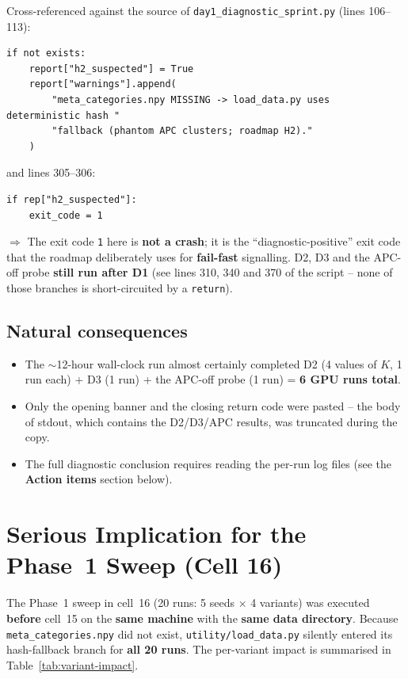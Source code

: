 \documentclass[11pt,a4paper]{article}
\begin{document}
\noindent Cross-referenced against the source of
\texttt{day1\_diagnostic\_sprint.py} (lines 106--113):

\begin{lstlisting}[style=py]
if not exists:
    report["h2_suspected"] = True
    report["warnings"].append(
        "meta_categories.npy MISSING -> load_data.py uses deterministic hash "
        "fallback (phantom APC clusters; roadmap H2)."
    )
\end{lstlisting}

\noindent and lines 305--306:

\begin{lstlisting}[style=py]
if rep["h2_suspected"]:
    exit_code = 1
\end{lstlisting}

\noindent $\Rightarrow$ The exit code \texttt{1} here is \textbf{not a crash}; it is the
``diagnostic-positive'' exit code that the roadmap deliberately uses for
\textbf{fail-fast} signalling. D2, D3 and the APC-off probe \textbf{still run
after D1} (see lines 310, 340 and 370 of the script -- none of those branches
is short-circuited by a \texttt{return}).

\subsection*{Natural consequences}

\begin{itemize}[leftmargin=*]
  \item The $\sim$12-hour wall-clock run almost certainly completed
        D2 (4 values of $K$, 1 run each) + D3 (1 run) + the APC-off probe
        (1 run) = \textbf{6 GPU runs total}.
  \item Only the opening banner and the closing return code were pasted -- the
        body of stdout, which contains the D2/D3/APC results, was truncated
        during the copy.
  \item The full diagnostic conclusion requires reading the per-run log files
        (see the \textbf{Action items} section below).
\end{itemize}

\section{Serious Implication for the Phase~1 Sweep (Cell 16)}

The Phase~1 sweep in cell~16 (20 runs: 5 seeds $\times$ 4 variants) was
executed \textbf{before} cell~15 on the \textbf{same machine} with the
\textbf{same data directory}. Because \texttt{meta\_categories.npy} did not
exist, \texttt{utility/load\_data.py} silently entered its hash-fallback branch
for \textbf{all 20 runs}. The per-variant impact is summarised in
Table~\ref{tab:variant-impact}.
\end{document}
